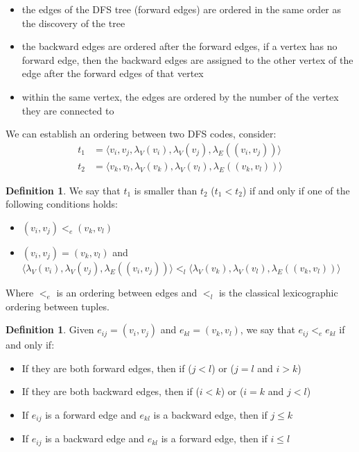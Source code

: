 \documentclass[12pt, openany]{report}
\theoremstyle{definition}
\newtheorem{definition}[thm]{Definition}
\begin{document}
\begin{itemize}
    \item the edges of the DFS tree (forward edges) are ordered in the same order as the discovery of the tree
    \item the backward edges are ordered after the forward edges, if a vertex has no forward edge, then the backward edges are assigned to the other vertex of the edge after the forward edges of that vertex
    \item within the same vertex, the edges are ordered by the number of the vertex they are connected to
\end{itemize}
We can establish an ordering between two DFS codes, consider:
\begin{equation}
    \begin{aligned}
        t_1 &= \langle v_i , v_j , \lambda_V (v_i ), \lambda_V (v_j ), \lambda_E ((v_i , v_j ))\rangle \\
        t_2 &= \langle v_k , v_l , \lambda_V (v_k ), \lambda_V (v_l ), \lambda_E ((v_k , v_l ))\rangle
    \end{aligned}
\end{equation}
\begin{definition}
    We say that $t_1$ is smaller than $t_2$  ($t_1 < t_2$) if and only if one of the following conditions holds:
    \begin{itemize}
        \item $(v_i, v_j) <_e (v_k, v_l)$
        \item $(v_i, v_j) = (v_k, v_l)$ and $\langle \lambda_V (v_i ), \lambda_V (v_j ), \lambda_E ((v_i , v_j ))\rangle <_l \langle \lambda_V (v_k ), \lambda_V (v_l ), \lambda_E ((v_k , v_l ))\rangle$
    \end{itemize}
\end{definition}
Where $<_e$ is an ordering between edges and $<_l$ is the classical lexicographic ordering between tuples.
\begin{definition}
    Given $e_{ij} = (v_i, v_j)$ and $e_{kl} = (v_k, v_l)$, we say that $e_{ij} <_e e_{kl}$ if and only if:
    \begin{itemize}
        \item If they are both forward edges, then if ($j < l$) or ($j = l$ and $i > k$)
        \item If they are both backward edges, then if ($i < k$) or ($i = k$ and $j < l$)
        \item If $e_{ij}$ is a forward edge and $e_{kl}$ is a backward edge, then if  $j \leq k$
        \item If $e_{ij}$ is a backward edge and $e_{kl}$ is a forward edge, then if  $i \leq l$
    \end{itemize}
\end{definition}
\end{document}

